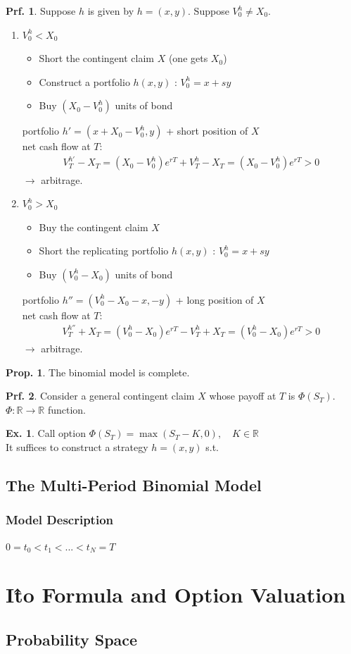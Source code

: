 \documentclass[a4paper,11pt]{jsarticle}
\theoremstyle{definition}
\newtheorem{prf}{Prf.}[subsection]
\newtheorem{prop}{Prop.}[subsection]
\newtheorem{ex}{Ex.}[subsection]
\begin{document}
\begin{prf}
  Suppose $h$ is given by $h=(x,y)$. Suppose $V_0^h\neq X_0$.
  \begin{enumerate}
    \item $V_0^h<X_0$
    \begin{itemize}
      \item Short the contingent claim $X$ (one gets $X_0$)
      \item Construct a portfolio $h(x,y)$ : $V_0^h=x+sy$
      \item Buy $(X_0-V_0^h)$ units of bond 
    \end{itemize}
    portfolio $h'=(x+X_0-V_0^h, y)$ + short position of $X$ \\
    net cash flow at $T$:
    \begin{align}
      V_T^{h'}-X_T=(X_0-V_0^h)e^{rT}+V_T^h -X_T
      =(X_0-V_0^h)e^{rT} > 0
    \end{align}  
    $\rightarrow$ arbitrage.
    \item $V_0^h>X_0$
    \begin{itemize}
      \item Buy the contingent claim $X$
      \item Short the replicating portfolio $h(x,y)$
      : $V_0^h=x+sy$
      \item Buy $(V_0^h-X_0)$ units of bond 
    \end{itemize}
    portfolio $h''=(V_0^h-X_0-x, -y)$ + long position of $X$ \\
    net cash flow at $T$:
    \begin{align}
      V_T^{h''}+X_T=(V_0^h-X_0)e^{rT}-V_T^h +X_T
      =(V_0^h-X_0)e^{rT} > 0
    \end{align}  
    $\rightarrow$ arbitrage.
  \end{enumerate}
\end{prf}


\begin{prop}
  The binomial model is complete.
\end{prop}

\begin{prf}
  Consider a general contingent claim $X$
  whose payoff at $T$ is $\Phi(S_T)$.
  $\Phi : \mathbb{R} \to \mathbb{R}$ function.
  \begin{ex}
    Call option $\Phi(S_T)=\max(S_T-K,0), \quad K\in\mathbb{R}$\\
    It suffices to construct a strategy $h=(x,y)$ s.t.
  \end{ex}
\end{prf}



\subsection{The Multi-Period Binomial Model}
\subsubsection{Model Description}
$0=t_0<t_1<...<t_N=T$

\newpage
\section{I\^{t}o Formula and Option Valuation}
\subsection{Probability Space}
\end{document}
